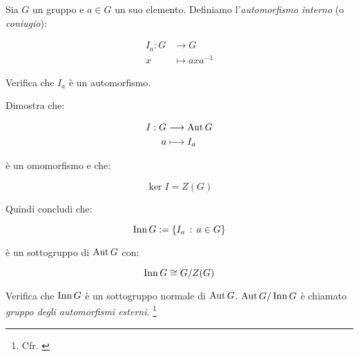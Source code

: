 \begin{esercizio}
	\label{ex:automorfismi_interni}
	Sia $G$ un gruppo e $a \in G$ un suo elemento. Definiamo l'\emph{automorfismo interno} (o \emph{coniugio}):
	
	\begin{align}
		I_a: G &\longrightarrow G \\
		 x &\longmapsto axa^{-1}
	\end{align}

	Verifica che $I_a$ è un automorfismo.
	
	Dimostra che:
	
	\begin{align}
		I: G &\longrightarrow \operatorname{Aut} G \\
		a &\longmapsto I_a
	\end{align}
	
	è un omomorfismo e che:
	
	\begin{equation}
		\ker I = Z(G)
	\end{equation}
	
	Quindi concludi che:
	
	\begin{equation}
		\operatorname{Inn} G := \{I_a \,:\, a \in G\}
	\end{equation} 

	è un sottogruppo di $\operatorname{Aut} G$ con:
	
	\begin{equation}
		\operatorname{Inn} G \cong G/Z(G)
	\end{equation}
	
	Verifica che $\operatorname{Inn} G$ è un sottogruppo normale di $\operatorname{Aut} G$. $\operatorname{Aut} G/\operatorname{Inn} G$ è chiamato \emph{gruppo degli automorfismi esterni}.
	\footnote{Cfr. \cite[pag. 63, es. n. 6]{jacobson}}
\end{esercizio}
